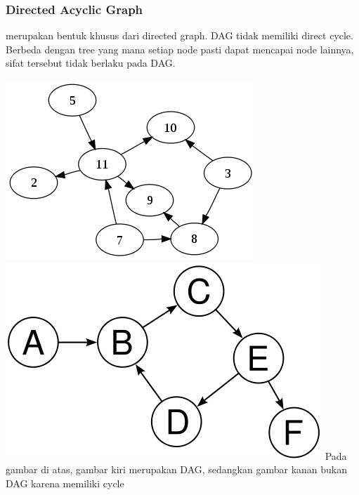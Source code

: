 \begin{frame}
\frametitle{Directed Acyclic Graph}
 merupakan bentuk khusus dari directed graph. DAG tidak memiliki direct cycle. Berbeda dengan tree yang mana setiap node pasti dapat mencapai node lainnya, sifat tersebut tidak berlaku pada DAG.

\includegraphics[width=4 cm]{asset/dag.png}
\hspace{\fill}
\includegraphics[width=4 cm]{asset/not-dag.png}
\newline\newline
Pada gambar di atas, gambar kiri merupakan DAG, sedangkan gambar kanan bukan DAG karena memiliki cycle
\end{frame}



